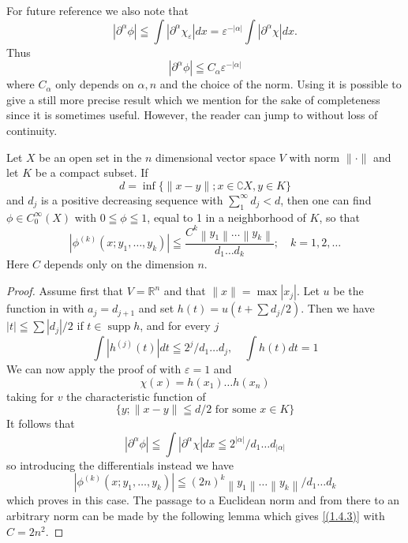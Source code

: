 For future reference we also note that
\[
	\left|\partial^{\alpha} \phi\right| \leqq \int\left|\partial^{\alpha} \chi_{\varepsilon}\right| d x=\varepsilon^{-|\alpha|} \int\left|\partial^{\alpha} \chi\right| d x .
\]
Thus
\begin{equation}
    \label{(1.4.2)}
    \left|\partial^{\alpha} \phi\right| \leqq C_{\alpha} \varepsilon^{-|\alpha|}
\end{equation}
where $C_{\alpha}$ only depends on $\alpha, n$ and the choice of the norm. Using  it is possible to give a still more precise result which we mention for the sake of completeness since it is sometimes useful. However, the reader can jump to  without loss of continuity.
\begin{theorem}
    Let $X$ be an open set in the $n$ dimensional vector space $V$ with norm $\|\cdot\|$ and let $K$ be a compact subset. If
\[
d = \inf\{\|x-y\|; x\in \complement X,y\in K\}
\]
and $d_{j}$ is a positive decreasing sequence with $\sum_{1}^{\infty} d_{j}<d$, then one can find $\phi \in C_{0}^{\infty}(X)$ with $0 \leqq \phi \leqq 1$, equal to 1 in a neighborhood of $K$, so that
\begin{equation}
    \label{(1.4.3)}
    \left|\phi^{(k)}\left(x ; y_{1}, \ldots, y_{k}\right)\right| \leqq \frac{C^{k}\left\|y_{1}\right\| \ldots\left\|y_{k}\right\|}{d_{1} \ldots d_{k}} ; \quad k=1,2, \ldots
\end{equation}
Here $C$ depends only on the dimension $n$.
\end{theorem}
\begin{proof}
    Assume first that $V=\mathbb{R}^{n}$ and that $\|x\|=\max \left|x_{j}\right|$. Let $u$ be the function in  with $a_{j}=d_{j+1}$ and set $h(t)=u\left(t+\sum d_{j} / 2\right)$. Then we have $|t| \leqq \sum\left|d_{j}\right| / 2$ if $t \in \operatorname{supp} h$, and for every $j$
\[
	\int\left|h^{(j)}(t)\right| d t \leqq 2^{j} / d_{1} \ldots d_{j}, \quad \int h(t) d t=1
\]
We can now apply the proof of  with $\varepsilon=1$ and
\[
	\chi(x)=h\left(x_{1}\right) \ldots h\left(x_{n}\right)
\]
taking for $v$ the characteristic function of
\[
	\{y ;\|x-y\| \leqq d / 2 \text { for some } x \in K\}
\]
It follows that
\[
	\left|\partial^{\alpha} \phi\right| \leqq \int\left|\partial^{\alpha} \chi\right| d x \leqq 2^{|\alpha|} / d_{1} \ldots d_{|\alpha|}
\]
so introducing the differentials instead we have
\[
	\left|\phi^{(k)}\left(x ; y_{1}, \ldots, y_{k}\right)\right| \leqq(2 n)^{k}\left\|y_{1}\right\| \ldots\left\|y_{k}\right\| / d_{1} \ldots d_{k}
\]
which proves  in this case. The passage to a Euclidean norm and from there to an arbitrary norm can be made by the following lemma which gives \eqref{(1.4.3)} with $C=2 n^{2}$.
\end{proof}
